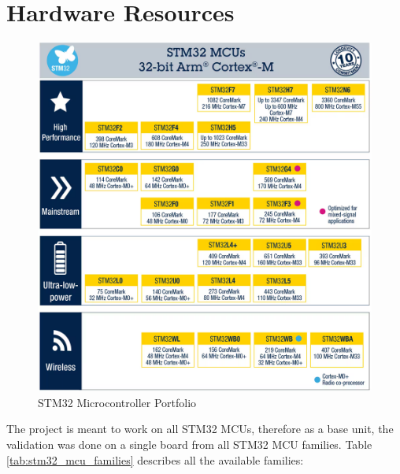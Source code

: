 \section{Hardware Resources}
\begin{figure}[H]
	\centering
	\includegraphics[width=15cm]{img/ST_Summer_Internship/arm_cortex_mcu_portfolio.png}
	\caption{STM32 Microcontroller Portfolio}
	\label{fig:stm32_portfolio}
\end{figure}
The project is meant to work on all STM32 MCUs, therefore as a base unit, the validation was done on a single board from all STM32 MCU families.
Table \ref{tab:stm32_mcu_families} describes all the available families:
